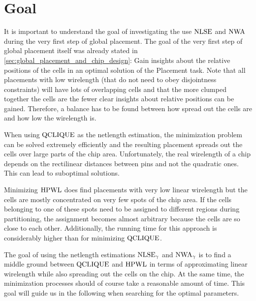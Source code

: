 \section{Goal} \label{sec:goal}

It is important to understand the goal of investigating the use \(\operatorname{NLSE}\) and \(\operatorname{NWA}\)
during the very first step of global placement.
The goal of the very first step of global placement itself was already stated in \cref{sec:global_placement_and_chip_design}:
Gain insights about the relative positions of the cells in an optimal solution of the Placement task.
Note that all placements with low wirelength (that do not need to obey disjointness constraints)
will have lots of overlapping cells and that the more clumped together the cells are
the fewer clear insights about relative positions can be gained.
Therefore, a balance has to be found between how spread out the cells are and
how low the wirelength is.

When using \(\operatorname{QCLIQUE}\) as the netlength estimation,
the minimization problem can be solved extremely efficiently
and the resulting placement spreads out the cells over large parts of the chip area.
Unfortunately, the real wirelength of a chip depends on the rectilinear distances
between pins and not the quadratic ones.
This can lead to suboptimal solutions.

Minimizing \(\operatorname{HPWL}\) does find placements with very low linear wirelength
but the cells are mostly concentrated on very few spots of the chip area.
If the cells belonging to one of these spots need to be assigned to different regions
during partitioning, the assignment becomes almost arbitrary because the cells are so close to each other.
Additionally, the running time for this approach is considerably higher than
for minimizing \(\operatorname{QCLIQUE}\).

The goal of using the netlength estimations \(\operatorname{NLSE}_\gamma\) and \(\operatorname{NWA}_\gamma\)
is to find a middle ground between \(\operatorname{QCLIQUE}\) and \(\operatorname{HPWL}\) in terms of
approximating linear wirelength while also spreading out the cells on the chip.
At the same time, the minimization processes should of course take a reasonable amount of time.
This goal will guide us in the following when searching for the optimal parameters.
